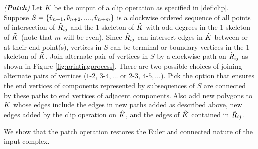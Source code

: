 \begin{defn} \label{def:patch}
  \emph{({\bfseries Patch})}
  Let $\tilde{K}$ be the output of a clip operation as specified in \cref{def:clip}.
  Suppose $S= \{\tilde{v}_{n+1}, \tilde{v}_{n+2}, .... , \tilde{v}_{n+m}\}$ is a clockwise ordered sequence of all points of intersection of $\tilde{R}_{ij}$ and the $1$-skeleton of $\hat{K}$ with odd degrees in the $1$-skeleton of $\tilde{K}$
  (note that $m$ will be even).
  Since $\tilde{R}_{ij}$ can intersect edges in $\hat{K}$ between or at their end point(s), vertices in $S$ can be terminal or boundary vertices in the $1$-skeleton of $\tilde{K}$.
  Join alternate pair of vertices in $S$ by a clockwise path on $\tilde{R}_{ij}$ as shown in Figure \ref{fig:printingprocess}.
  There are two possible choices of joining alternate pairs of vertices ($1$-$2$, $3$-$4,\dots$ or $2$-$3$, $4$-$5,\dots$).
  Pick the option that ensures the end vertices of components represented by subsequences of $S$ are connected by these paths to end vertices of adjacent components.
  Also add new polygons to $\tilde{K}$ whose edges include the edges in new paths added as described above, new edges added by the clip operation on $\hat{K}$, and the edges of $\hat{K}$ contained in $\tilde{R}_{ij}$.	
\end{defn}

We show that the patch operation restores the Euler and connected nature of the input complex.

